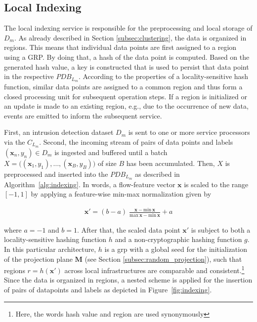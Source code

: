 \documentclass[../../main.tex]{subfiles}
\begin{document}
\subsection{Local Indexing} \label{sec:local_indexing}

The local indexing service is responsible for the preprocessing and local storage of $D_m$. As already described in Section \ref{subsec:clustering}, the data is organized in regions. This means that individual data points are first assigned to a region using a GRP. By doing that, a hash of the data point is computed. Based on the generated hash value, a key is constructed that is used to persist that data point in the respective $PDB_{L_m}$. According to the properties of a locality-sensitive hash function, similar data points are assigned to a common region and thus form a closed processing unit for subsequent operation steps. If a region is initialized or an update is made to an existing region, e.g., due to the occurrence of new data, events are emitted to inform the subsequent service. 

 First, an intrusion detection dataset $D_m$ is sent to one or more service processors via the $C_{L_m}$. Second, the incoming stream of pairs of data points and labels $(\bm{x}_n, y_n) \in D_m$ is ingested and buffered until a batch $X=\bigl((\bm{x}_1, y_1), \dots, (\bm{x}_B, y_B)\bigr)$ of size $B$ has been accumulated. Then, $X$ is preprocessed and inserted into the $PDB_{L_m}$ as described in Algorithm~\ref{alg:indexing}. In words, a flow-feature vector $\bm{x}$ is scaled to the range $[-1, 1]$ by applying a feature-wise min-max normalization given by

\begin{align}\label{eq:normalization}
    \bm{x}' = (b-a) \; \frac{\bm{x} - \text{min}\,\bm{x}}{\text{max}\,\bm{x} - \text{min}\,\bm{x}} + a
\end{align}

where $a=-1$ and $b=1$. After that, the scaled data point $\bm{x}'$ is subject to both a locality-sensitive hashing function $h$ and a non-cryptographic hashing function $g$. In this particular architecture, $h$ is a \gls{grp} with a global seed for the initialization of the projection plane $\bm{M}$ (see Section \ref{subsec:random_projection}), such that regions $r = h(\bm{x}')$ across local infrastructures are comparable and consistent.\footnote{Here, the words hash value and region are used synonymously} Since the data is organized in regions, a nested scheme is applied for the insertion of pairs of datapoints and labels as depicted in Figure~\ref{fig:indexing}. 
\end{document}

